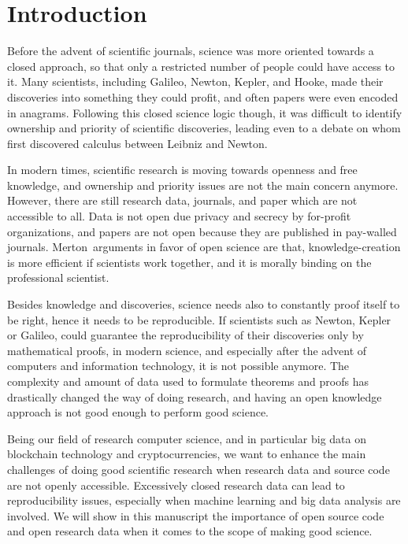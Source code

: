 \section{Introduction}
Before the advent of scientific journals,
science was more oriented towards a closed approach, so that only a restricted number
of people could have access to it.
Many scientists, including Galileo, Newton, Kepler, and Hooke, made their discoveries into
something they could profit, and often papers were even encoded in anagrams.
Following this closed science logic though, it was difficult
to identify ownership and priority of scientific discoveries, leading even to
a debate on whom first discovered calculus between
Leibniz and Newton.

In modern times, scientific research is moving towards openness and free knowledge,
and ownership and priority issues are not the main concern anymore. However,
there are still research data, journals, and paper which are not accessible to all.
Data is not open due privacy and secrecy by for-profit organizations, and
papers are not open because they are published in pay-walled journals.
Merton\,\cite{merton1942science} arguments in favor of open science are
that, knowledge-creation is more efficient if scientists work together, and
it is morally binding on the professional scientist.

Besides knowledge and discoveries, science needs also to constantly proof itself
to be right, hence it needs to be reproducible. If scientists such as Newton, Kepler or Galileo,
could guarantee the reproducibility of their discoveries only by mathematical proofs,
in modern science, and especially after the advent of computers and information technology,
it is not possible anymore. The complexity and amount of data used
to formulate theorems and proofs has drastically changed the way of doing research,
and having an open knowledge approach is not good enough to perform good science.

Being our field of research computer science, and in particular
big data on blockchain technology and cryptocurrencies,
we want to enhance the main challenges of doing good scientific
research when research data and source code are not openly accessible.
Excessively closed research data can lead to reproducibility issues,
especially when machine learning and big data analysis are involved.
%
We will show in this manuscript the importance of open source code
and open research data when it comes to the scope of making good science.

